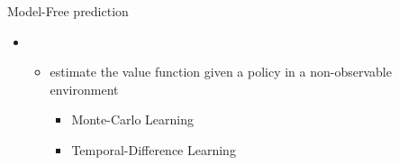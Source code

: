 \bgroup
\begin{frame}{Model-Free prediction}
\begin{itemize}
\item {}
\begin{itemize}
\item estimate the value function given a policy in a non-observable environment
\begin{itemize}
\item Monte-Carlo Learning
\item Temporal-Difference Learning
\end{itemize}
\end{itemize}
\end{itemize}
\end{frame}
\egroup